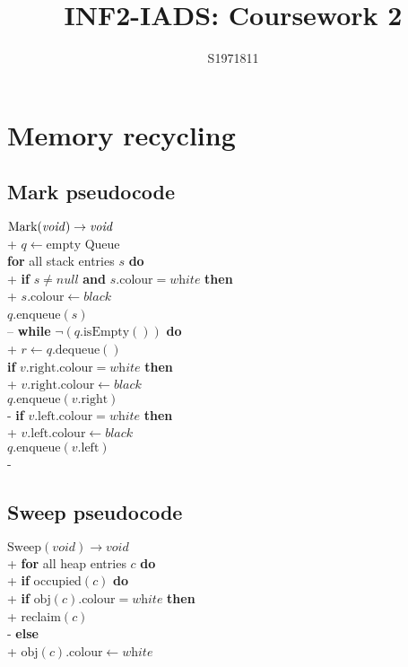 \documentclass{article}
\title{INF2-IADS: Coursework 2}
\author{S1971811}
\begin{document}
\maketitle

\tableofcontents

\section{Memory recycling}

\subsection{Mark pseudocode}

\begin{pseudo}
$\text{Mark}(\text{\emph{void}}) \to \text{\emph{void}}$\\+
    $q\leftarrow \text{empty Queue}$\\
    \textbf{for} all stack entries $s$ \textbf{do}\\+
        \textbf{if} $s\not=\textit{null}$ \textbf{and} $s.\text{colour} = \textit{white}$ \textbf{then}\\+
            $s.\text{colour} \leftarrow \textit{black}$\\
            $q$.enqueue$(s)$\\--
    \textbf{while} $\neg(q.\text{isEmpty}())$ \textbf{do}\\+
        $r\leftarrow q.\text{dequeue}()$\\
        \textbf{if} $v.\text{right}.\text{colour} = \textit{white}$ \textbf{then}\\+
            $v.\text{right}.\text{colour}\leftarrow\textit{black}$\\
            $q.\text{enqueue}(v.\text{right})$\\-
        \textbf{if} $v.\text{left}.\text{colour} = \textit{white}$ \textbf{then}\\+
            $v.\text{left}.\text{colour}\leftarrow\textit{black}$\\
            $q.\text{enqueue}(v.\text{left})$\\-
\end{pseudo}

\subsection{Sweep pseudocode}

\begin{pseudo}
$\text{Sweep}(\textit{void})\to\textit{void}$\\+
    \textbf{for} all heap entries $c$ \textbf{do}\\+
        \textbf{if} occupied$(c)$ \textbf{do}\\+
            \textbf{if} $\text{obj}(c).\text{colour} = \textit{white}$ \textbf{then}\\+
                reclaim$(c)$\\-
            \textbf{else}\\+
                $\text{obj}(c).\text{colour}\leftarrow\textit{white}$
\end{pseudo}
\end{document}
